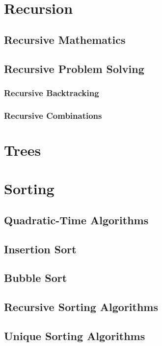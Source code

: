 \documentclass[10pt,a4paper]{book}
\begin{document}
\chapter{Recursion}

\section{Recursive Mathematics}

\section{Recursive Problem Solving}

\subsection{Recursive Backtracking}
\subsection{Recursive Combinations}


\chapter{Trees}
\chapter{Sorting}


\section{Quadratic-Time Algorithms}

\section{Insertion Sort}

\section{Bubble Sort}

\section{Recursive Sorting Algorithms}


\section{Unique Sorting Algorithms}
\end{document}
